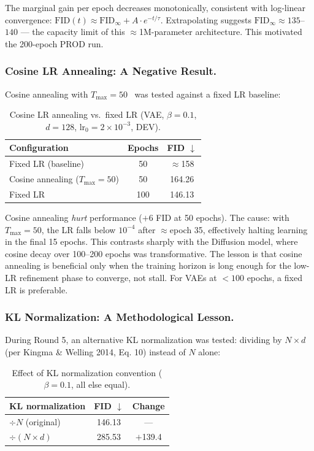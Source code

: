 \documentclass[runningheads]{llncs}
\begin{document}
The marginal gain per epoch decreases monotonically, consistent with log-linear convergence: $\mathrm{FID}(t) \approx \mathrm{FID}_\infty + A\cdot e^{-t/\tau}$. Extrapolating suggests $\mathrm{FID}_\infty \approx 135$--$140$ — the capacity limit of this $\approx$1M-parameter architecture. This motivated the 200-epoch PROD run.

\subsubsection{Cosine LR Annealing: A Negative Result.}\label{sec:cosine_vae}

Cosine annealing with $T_\text{max}=50$~\cite{loshchilov2017} was tested against a fixed LR baseline:

\begin{table}[htbp]
\caption{Cosine LR annealing vs.\ fixed LR (VAE, $\beta=0.1$, $d=128$, lr$_0=2{\times}10^{-3}$, DEV).}\label{tab:cosine_vae}
\centering
\begin{tabular}{lcc}
\toprule
Configuration & Epochs & FID $\downarrow$ \\
\midrule
Fixed LR (baseline) & 50  & $\approx$158 \\
Cosine annealing ($T_\text{max}=50$) & 50 & 164.26 \\
Fixed LR & 100 & 146.13 \\
\bottomrule
\end{tabular}
\end{table}

Cosine annealing \emph{hurt} performance ($+$6 FID at 50 epochs). The cause: with $T_\text{max}=50$, the LR falls below $10^{-4}$ after $\approx$epoch 35, effectively halting learning in the final 15 epochs. This contrasts sharply with the Diffusion model, where cosine decay over 100--200 epochs was transformative. The lesson is that cosine annealing is beneficial only when the training horizon is long enough for the low-LR refinement phase to converge, not stall. For VAEs at $<100$ epochs, a fixed LR is preferable.

\subsubsection{KL Normalization: A Methodological Lesson.}\label{sec:kl_norm}

During Round 5, an alternative KL normalization was tested: dividing by $N \times d$ (per Kingma \& Welling 2014, Eq. 10) instead of $N$ alone:

\begin{table}[htbp]
\caption{Effect of KL normalization convention ($\beta=0.1$, all else equal).}\label{tab:kl_norm}
\centering
\begin{tabular}{lcc}
\toprule
KL normalization & FID $\downarrow$ & Change \\
\midrule
$\div N$ (original) & 146.13 & — \\
$\div (N \times d)$ & 285.53 & $+$139.4 \\
\bottomrule
\end{tabular}
\end{table}
\end{document}
